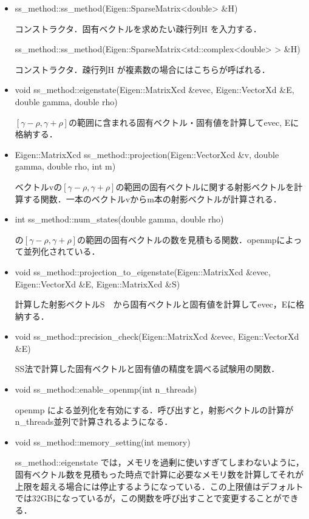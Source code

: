\documentclass[report, 11pt, uplatex]{jsbook}
\begin{document}
	\begin{itemize}
		\item ss\_method::ss\_method(Eigen::SparseMatrix<double> \&H)
		
		コンストラクタ．固有ベクトルを求めたい疎行列H を入力する．
		
		ss\_method::ss\_method(Eigen::SparseMatrix<std::complex<double> > \&H)
		
		コンストラクタ．疎行列H が複素数の場合にはこちらが呼ばれる．
		
		\item void ss\_method::eigenstate(Eigen::MatrixXcd \&evec, Eigen::VectorXd \&E, double gamma, double rho)
		
		$[\gamma-\rho,\gamma+\rho]$の範囲に含まれる固有ベクトル・固有値を計算してevec, Eに格納する．
		
		\item Eigen::MatrixXcd ss\_method::projection(Eigen::VectorXcd \&v, double gamma, double rho, int m)
		
		ベクトルvの$[\gamma-\rho,\gamma+\rho]$の範囲の固有ベクトルに関する射影ベクトルを計算する関数．一本のベクトルvからm本の射影ベクトルが計算される．
		
		\item int ss\_method::num\_states(double gamma, double rho)
		
		の$[\gamma-\rho,\gamma+\rho]$の範囲の固有ベクトルの数を見積もる関数．openmpによって並列化されている．
		
		
		\item void ss\_method::projection\_to\_eigenstate(Eigen::MatrixXcd \&evec, Eigen::VectorXd \&E, Eigen::MatrixXcd \&S)
		
		計算した射影ベクトルS　から固有ベクトルと固有値を計算してevec，Eに格納する．
		
		\item void ss\_method::precision\_check(Eigen::MatrixXcd \&evec, Eigen::VectorXd \&E)
		
		SS法で計算した固有ベクトルと固有値の精度を調べる試験用の関数．
		
		\item void ss\_method::enable\_openmp(int n\_threads)
		
		openmp による並列化を有効にする．呼び出すと，射影ベクトルの計算がn\_threads並列で計算されるようになる．
		
		\item void ss\_method::memory\_setting(int memory)
		
		ss\_method::eigenstate では，メモリを過剰に使いすぎてしまわないように，固有ベクトル数を見積もった時点で計算に必要なメモリ数を計算してそれが上限を超える場合には停止するようになっている．この上限値はデフォルトでは32GBになっているが，この関数を呼び出すことで変更することができる．
		

\end{itemize}
\end{document}
